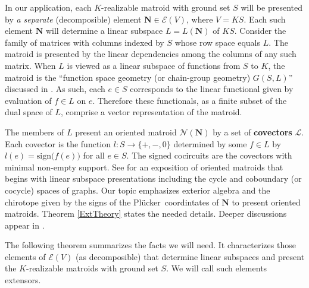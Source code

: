 \documentclass[12pt]{article}
\theoremstyle{definition}
\newcommand{\FieldK}{\ensuremath{K}}
\newcommand{\ext}[1]{\ensuremath{\mathbf{#1}}}
\newcommand{\Plucker}{Pl\"{u}cker\ }
\begin{document}
In our application, each $\FieldK$-realizable matroid with ground
set $S$ will be presented by \emph{a separate} 
(decomposible)
element $\ext{N}\in\mathcal{E}(V)$, where $V=\FieldK S$.  
Each such element $\ext{N}$ 
will determine a linear subspace $L=L(\ext{N})$ of $\FieldK S$.
Consider the family of matrices with 
columns indexed by $S$ whose row space equals $L$.
The matroid
is presented by the linear dependencies among the columns
of any such matrix.  When $L$ is viewed as a linear 
subspace of functions from $S$ to $\FieldK$, the matroid
is the ``function space geometry (or chain-group geometry)
$G(S,L)$'' discussed in \cite[.C]{TheoryMatroids}.
As such, each $e\in S$ corresponds to the linear 
functional given by evaluation of $f\in L$ on $e$.
Therefore these functionals, as a
finite subset of the dual space of $L$, 
comprise a vector representation of the matroid.

The members of $L$ present an oriented matroid
$\mathcal{N}(\ext{N})$ by a set of 
\textbf{covectors} $\mathcal{L}$.  Each covector
is the function $l:S\rightarrow\{+,-,0\}$ determined
by some $f\in L$ by $l(e)=\mbox{sign}\big(f(e)\big)$ for
all $e\in S$.  The signed cocircuits are the 
covectors with minimal non-empty support.
See \cite{BachemKern} for an exposition of
oriented matroids that begins with 
linear subspace presentations including
the cycle and coboundary (or cocycle) spaces 
of graphs.  
Our topic emphasizes exterior algebra
and the chirotope given by the
signs of the \Plucker coordintates of $\ext{N}$
to present oriented
matroids.
Theorem \ref{ExtTheory} states the needed details.
Deeper discussions appear in 
\cite[especially  on stratifications of the
Grassmann variety and chap. 8 on realizations]{OMBOOK}.

The following
theorem summarizes the facts we will need.  It characterizes those
elements of $\mathcal{E}(V)$ (as decomposible) that determine linear subspaces
and present the $\FieldK$-realizable matroids with ground set $S$.
We will call such elements extensors.
\end{document}
